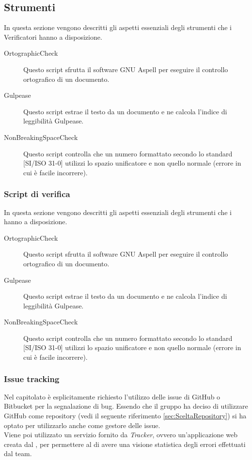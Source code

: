 	\subsection{Strumenti}
		In questa sezione vengono descritti gli aspetti essenziali degli strumenti che i Verificatori hanno a disposizione.
		\begin{description}
			\item[OrtographicCheck] Questo script sfrutta il software GNU Aspell per eseguire il controllo ortografico di un documento.
			\item[Gulpease] Questo script estrae il testo da un documento e ne calcola l'indice di leggibilità Gulpease.
			\item[NonBreakingSpaceCheck] Questo script controlla che un numero formattato secondo lo standard [SI/ISO 31-0] utilizzi lo spazio unificatore e non quello normale (errore in cui è facile incorrere).
		\end{description}
		\subsubsection{Script di verifica}
			In questa sezione vengono descritti gli aspetti essenziali degli strumenti che i  hanno a disposizione.
			\begin{description}
				\item[OrtographicCheck] Questo script sfrutta il software GNU Aspell per eseguire il controllo ortografico di un documento.
				\item[Gulpease] Questo script estrae il testo da un documento e ne calcola l'indice di leggibilità Gulpease.
				\item[NonBreakingSpaceCheck] Questo script controlla che un numero formattato secondo lo standard [SI/ISO 31-0] utilizzi lo spazio unificatore e non quello normale (errore in cui è facile incorrere).
			\end{description}
		\subsubsection{Issue tracking}
			Nel capitolato è esplicitamente richiesto l'utilizzo delle issue di GitHub o Bitbucket per la segnalazione di bug. Essendo che il gruppo \groupname{} ha deciso di utilizzare GitHub come repository (vedi il seguente riferimento \autoref{sec:SceltaRepository}) si ha optato per utilizzarlo anche come gestore delle issue.\\
			Viene poi utilizzato un servizio fornito da \textit{Tracker}, ovvero un'applicazione web creata dal \groupname, per permettere al  di avere una visione statistica degli errori effettuati dal team.
